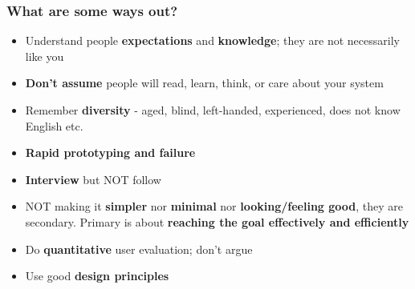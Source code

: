 \documentclass{beamer}
\begin{document}
\begin{frame}
\frametitle{What are some ways out?}
\begin{itemize}
	\item Understand people \textbf{expectations} and \textbf{knowledge}; they are not necessarily like you
	\item \textbf{Don't assume} people will read, learn, think, or care about your system
	\item Remember \textbf{diversity} - aged, blind, left-handed, experienced, does not know English etc.
	\item  \textbf{Rapid prototyping and failure}
	\item \textbf{Interview} but NOT follow
	\item NOT making it \textbf{simpler} nor \textbf{minimal} nor \textbf{ looking/feeling good},  they are secondary.  Primary is about \textbf{reaching the goal effectively and efficiently}
	\item Do \textbf{quantitative} user evaluation; don't argue
	\item Use good \textbf{design principles}
\end{itemize}
\end{frame}


\end{document}
